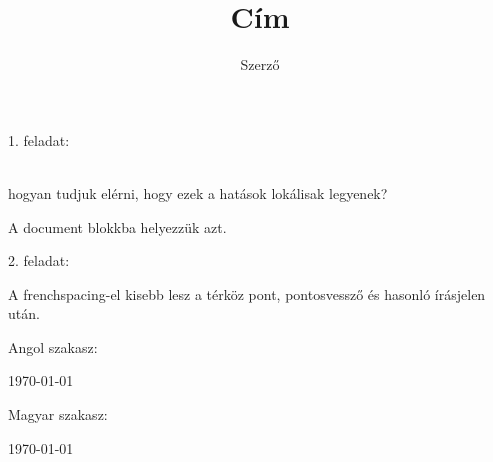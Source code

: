 \documentclass{article}
\begin{document}
\title{Cím}
\author{Szerző}
\maketitle

\begin{large}
1. feladat:
\end{large}

\noindent
\bigskip
\blindtext[2] \newpage

\begin{flushright}
\hulipsum[2-3]
\end{flushright} \newpage

{
\begin{otherlanguage}{latin}
\linespread{2}
\lipsum[2-3]
\end{otherlanguage} } \\

hogyan tudjuk elérni, hogy ezek a hatások lokálisak legyenek? \par
A document blokkba helyezzük azt. \\


\begin{large}
2. feladat:
\end{large}
A frenchspacing-el kisebb lesz a térköz pont, pontosvessző és hasonló írásjelen után.


Angol szakasz: \par
\begin{otherlanguage}{english}
\today
\end{otherlanguage}

Magyar szakasz: \par
\begin{otherlanguage}{magyar}
\today
\end{otherlanguage}
\end{document}
